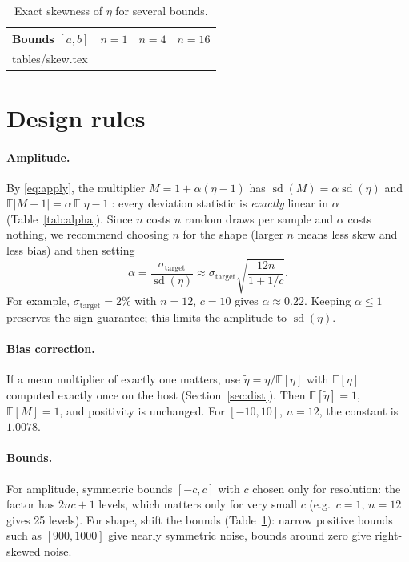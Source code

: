 \documentclass[10pt,a4paper]{article}
\theoremstyle{definition}
\theoremstyle{remark}
\newcommand{\E}{\mathbb{E}}
\begin{document}
\begin{table}[h]
\centering\small
\caption{Exact skewness of $\eta$ for several bounds.}
\label{tab:skew}
\begin{tabular}{lrrr}
\toprule
Bounds $[a,b]$ & $n=1$ & $n=4$ & $n=16$\\
\midrule
{} tables/skew.tex
\bottomrule
\end{tabular}
\end{table}

\section{Design rules}\label{sec:design}

\paragraph{Amplitude.} By \eqref{eq:apply}, the multiplier $M=1+\alpha(\eta-1)$ has
$\operatorname{sd}(M)=\alpha\operatorname{sd}(\eta)$ and $\E|M-1|=\alpha\,\E|\eta-1|$:
every deviation statistic is \emph{exactly} linear in $\alpha$ (Table~\ref{tab:alpha}).
Since $n$ costs $n$ random draws per sample and $\alpha$ costs nothing, we recommend choosing
$n$ for the shape (larger $n$ means less skew and less bias) and then setting
\begin{equation}
\alpha=\frac{\sigma_{\text{target}}}{\operatorname{sd}(\eta)}\approx
\sigma_{\text{target}}\sqrt{\frac{12n}{1+1/c}} .
\end{equation}
For example, $\sigma_{\text{target}}=2\%$ with $n=12$, $c=10$ gives $\alpha\approx0.22$.
Keeping $\alpha\le1$ preserves the sign guarantee; this limits the amplitude to
$\operatorname{sd}(\eta)$.

\paragraph{Bias correction.} If a mean multiplier of exactly one matters, use
$\tilde\eta=\eta/\E[\eta]$ with $\E[\eta]$ computed exactly once on the host (Section~\ref{sec:dist}).
Then $\E[\tilde\eta]=1$, $\E[M]=1$, and positivity is unchanged. For $[-10,10]$, $n=12$, the
constant is $1.0078$.

\paragraph{Bounds.} For amplitude, symmetric bounds $[-c,c]$ with $c$ chosen only for
resolution: the factor has $2nc+1$ levels, which matters only for very small $c$
(e.g.\ $c=1$, $n=12$ gives 25 levels). For shape, shift the bounds
(Table~\ref{tab:skew}): narrow positive bounds such as $[900,1000]$ give nearly symmetric
noise, bounds around zero give right-skewed noise.
\end{document}
